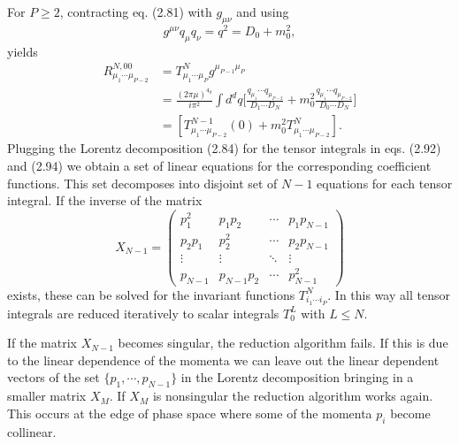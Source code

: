 For $P\geq2$, contracting eq. (2.81) with $g_{\mu\nu}$ and using
\begin{equation}
g^{\mu\nu}q_\mu q_\nu=q^2=D_0+m_0^2,
\end{equation}
yields
\begin{align}
R^{N,00}_{\mu_1\cdots\mu_{P-2}}&=T^N_{\mu_1\cdots\mu_P}g^{\mu_{P-1}\mu_P}\nonumber\\
&=\frac{(2\pi\mu)^{4_d}}{i\pi^2}\int d^dq\biggl[ \frac{q_{\mu_1}\cdots q_{\mu_{P-2}}}{D_1\cdots D_N}+m^2_0\frac{q_{\mu_1}\cdots q_{\mu_{P-2}}}{D_0\cdots D_N} \biggr]\nonumber\\
&=[T^{N-1}_{\mu_1\cdots\mu_{P-2}}(0)+m_0^2T^N_{\mu_1\cdots\mu_{P-2}}].
\end{align}
Plugging the Lorentz decomposition (2.84) for the tensor integrals in eqs. (2.92) and (2.94) we obtain a set of linear equations for the corresponding coefficient functions. This set decomposes into disjoint set of $N-1$ equations for each tensor integral. If the inverse of the matrix
\begin{equation}
X_{N-1}=
\left(
\begin{array}{cccc}
p_1^2 & p_1p_2 & \cdots & p_1p_{N-1}\\
p_2p_1 & p^2_2 & \cdots & p_2p_{N-1}\\
\vdots & \vdots & \ddots & \vdots \\
p_{N-1} & p_{N-1}p_2 & \cdots & p^2_{N-1}
\end{array}
\right)
\end{equation}
exists, these can be solved for the invariant functions $T^N_{i_1\cdots i_P}$. In this way all tensor integrals are reduced iteratively to scalar integrals $T^L_0$ with $L\leq N$.

If the matrix $X_{N-1}$ becomes singular, the reduction algorithm fails. If this is due to the linear dependence of the momenta we can leave out the linear dependent vectors of the set $\{p_1,\cdots,p_{N-1} \}$ in the Lorentz decomposition bringing in a smaller matrix $X_M$. If $X_M$ is nonsingular the reduction 
algorithm works again. This occurs at the edge of phase space where some of the momenta $p_i$ become collinear.

